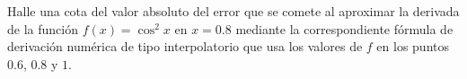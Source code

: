 \begin{ejercicio}\label{ej:2.1.8}
    Halle una cota del valor absoluto del error que se comete al aproximar la derivada de la función $f(x) = \cos^2 x$ en $x = 0.8$ mediante la correspondiente fórmula de derivación numérica de tipo interpolatorio que usa los valores de $f$ en los puntos $0.6$, $0.8$ y $1$.
\end{ejercicio}